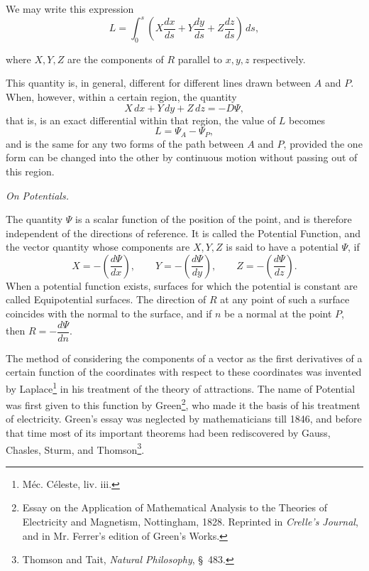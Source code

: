 \documentclass[11pt,a4paper]{article}
\begin{document}
We may write this expression
\[
L=\int_0^s\left(X\frac{dx}{ds}+Y\frac{dy}{ds}+Z\frac{dz}{ds}\right)\,ds,
\]

\clearpage
\setcounter{footnote}{0}

where \(X,Y,Z\) are the components of \(R\) parallel to \(x,y,z\)
respectively.

This quantity is, in general, different for different lines drawn
between \(A\) and \(P\). When, however, within a certain region, the
quantity
\[
X\,dx+Y\,dy+Z\,dz=-D\Psi,
\]
that is, is an exact differential within that region, the value of \(L\)
becomes
\[
L=\Psi_A-\Psi_P,
\]
and is the same for any two forms of the path between \(A\) and \(P\),
provided the one form can be changed into the other by continuous motion
without passing out of this region.

\begin{center}
\textit{On Potentials.}
\end{center}

The quantity \(\Psi\) is a scalar function of the position of the point,
and is therefore independent of the directions of reference. It is
called the Potential Function, and the vector quantity whose components
are \(X,Y,Z\) is said to have a potential \(\Psi\), if
\[
X=-\left(\frac{d\Psi}{dx}\right),\qquad
Y=-\left(\frac{d\Psi}{dy}\right),\qquad
Z=-\left(\frac{d\Psi}{dz}\right).
\]
When a potential function exists, surfaces for which the potential is
constant are called Equipotential surfaces. The direction of \(R\) at
any point of such a surface coincides with the normal to the surface,
and if \(n\) be a normal at the point \(P\), then \(R=-\dfrac{d\Psi}{dn}\).

The method of considering the components of a vector as the first
derivatives of a certain function of the coordinates with respect to
these coordinates was invented by Laplace\footnote{Méc. Céleste, liv.
iii.} in his treatment of the theory of attractions. The name of
Potential was first given to this function by Green\footnote{Essay on
the Application of Mathematical Analysis to the Theories of Electricity
and Magnetism, Nottingham, 1828. Reprinted in \textit{Crelle's Journal},
and in Mr. Ferrer's edition of Green's Works.}, who made it the basis of
his treatment of electricity. Green's essay was neglected by
mathematicians till 1846, and before that time most of its important
theorems had been rediscovered by Gauss, Chasles, Sturm, and
Thomson\footnote{Thomson and Tait, \textit{Natural Philosophy}, \S\
483.}.
\end{document}
